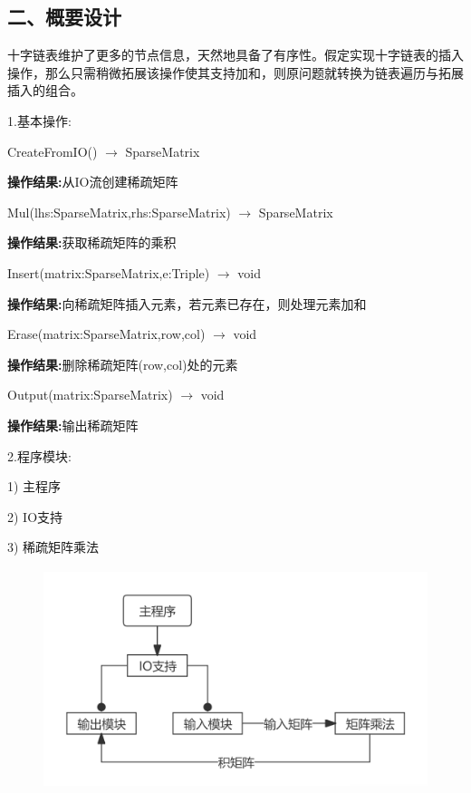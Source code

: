 \documentclass[UTF8, a4paper]{ctexart}
\begin{document}
\subsection*{二、概要设计}
十字链表维护了更多的节点信息，天然地具备了有序性。假定实现十字链表的插入操作，那么只需稍微拓展该操作使其支持加和，则原问题就转换为链表遍历与拓展插入的组合。 \par
1.\;基本操作: \par
	CreateFromIO() $\rightarrow$ SparseMatrix \par
	\qquad\textbf{操作结果:}\;从IO流创建稀疏矩阵 \par
	Mul(lhs:SparseMatrix,rhs:SparseMatrix) $\rightarrow$ SparseMatrix \par
	\qquad\textbf{操作结果:}\;获取稀疏矩阵的乘积 \par
	Insert(matrix:SparseMatrix,e:Triple) $\rightarrow$ void \par
	\qquad\textbf{操作结果:}\;向稀疏矩阵插入元素，若元素已存在，则处理元素加和 \par
	Erase(matrix:SparseMatrix,row,col) $\rightarrow$ void \par
	\qquad\textbf{操作结果:}\;删除稀疏矩阵(row,col)处的元素 \par
	Output(matrix:SparseMatrix) $\rightarrow$ void \par
	\qquad\textbf{操作结果:}\;输出稀疏矩阵 \par
2.\;程序模块: \par
1) 主程序 \par
2) IO支持 \par
3) 稀疏矩阵乘法 \par
\begin{figure}[H]
	\begin{minipage}[t]{\linewidth}
		\centering
		\includegraphics[width=125mm,height=64mm]{./assets/DS06-1}
	\end{minipage}
\end{figure}
\end{document}
